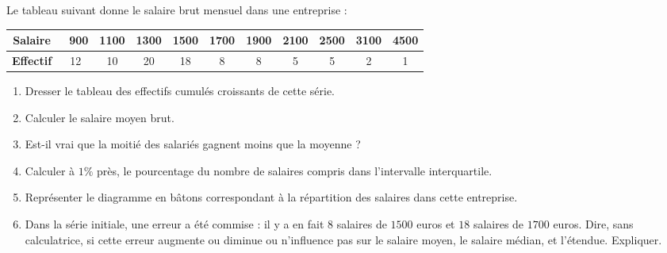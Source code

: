 
\begin{exercice}\label{exoSeconde-0037}

Le tableau suivant donne le salaire brut mensuel dans une entreprise : 
\bigskip

\begin{tabular}{|c||c|c|c|c|c|c|c|c|c|c|}
  \hline 
  \textbf{Salaire} & \ 900&1100&1300&1500&1700&1900&2100&2500&3100&4500\\
  \hline 
  \textbf{Effectif} & 12&10&20&18&8&8&5&5&2&1\\
  \hline
\end{tabular}


\begin{multicols}{2}
\begin{enumerate}
\item Dresser le tableau des effectifs cumulés croissants de cette série. 
\item Calculer le salaire moyen brut.

\item Est-il vrai que la moitié des salariés gagnent moins que la moyenne ?
\item Calculer à $1\%$ près, le pourcentage du nombre de salaires
  compris dans l'intervalle interquartile. 

\item Représenter le diagramme en bâtons correspondant à la répartition
  des salaires dans cette entreprise.

\item Dans la série initiale, une erreur a été commise : il y a en
  fait $8$ salaires de $1500$ euros et $18$ salaires de $1700$ euros.
  Dire, sans calculatrice, si cette erreur augmente ou diminue ou n'influence pas  sur le salaire moyen, le salaire médian, et l'étendue. Expliquer.

\end{enumerate}
\end{multicols}


\end{exercice}
